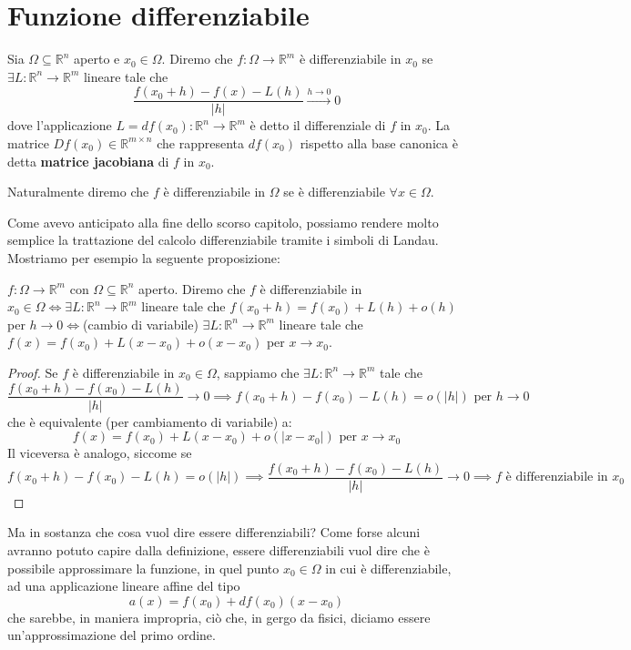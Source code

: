 \documentclass[openany]{book}
\begin{document}
\section{Funzione differenziabile}
\begin{definition}
Sia $\Omega \subseteq \mathbb{R}^n$ aperto e $x_0 \in \Omega$. Diremo che $f: \Omega \to \mathbb{R}^m$ è differenziabile in $x_0$ se $\exists L: \mathbb{R}^n \to \mathbb{R}^m$ lineare tale che
$$
\frac{f(x_0 + h)-f(x) - L(h)}{|h|} \stackrel{h \to 0}{\to} 0
$$
dove l'applicazione $L = df(x_0): \mathbb{R}^n \to \mathbb{R}^m$ è detto il differenziale di $f$ in $x_0$. La matrice $Df(x_0) \in \mathbb{R}^{m \times n}$ che rappresenta $df(x_0)$ rispetto alla base canonica è detta \textbf{matrice jacobiana} di $f$ in $x_0$.
\end{definition}
\begin{remark}
Naturalmente diremo che $f$ è differenziabile in $\Omega$ se è differenziabile $\forall x \in \Omega$.
\end{remark}
\noindent Come avevo anticipato alla fine dello scorso capitolo, possiamo rendere molto semplice la trattazione del calcolo differenziabile tramite i simboli di Landau. Mostriamo per esempio la seguente proposizione:
\begin{prop}
$f: \Omega \to \mathbb{R}^m$ con $\Omega \subseteq \mathbb{R}^n$ aperto. Diremo che $f$ è differenziabile in $x_0 \in \Omega \iff \exists L:\mathbb{R}^n \to \mathbb{R}^m$ lineare tale che $f(x_0 + h) = f(x_0) + L(h) + o(h)$ per $h \to 0 \iff $(cambio di variabile) $\exists L: \mathbb{R}^n \to \mathbb{R}^m$ lineare tale che $f(x) = f(x_0) + L(x-x_0) + o(x-x_0)$ per $x \to x_0$.
\end{prop}
\begin{proof}
Se $f$ è differenziabile in $x_0 \in \Omega$, sappiamo che $\exists L : \mathbb{R}^n \to \mathbb{R}^m$ tale che
$$
\frac{f(x_0 + h) - f(x_0) - L(h)}{|h|} \to 0 \implies f(x_0 + h) - f(x_0) - L(h) = o(|h|) \text{ per } h \to 0
$$
che è equivalente (per cambiamento di variabile) a:
$$
f(x) = f(x_0) + L(x-x_0) + o(|x-x_0|) \text{ per } x \to x_0
$$
Il viceversa è analogo, siccome se
$$
f(x_0 + h) - f(x_0) - L(h) = o(|h|) \implies \frac{f(x_0 + h) - f(x_0) - L(h)}{|h|} \to 0 \implies f \text{ è differenziabile in } x_0
$$
\end{proof}
\noindent Ma in sostanza che cosa vuol dire essere differenziabili? Come forse alcuni avranno potuto capire dalla definizione, essere differenziabili vuol dire che è possibile approssimare la funzione, in quel punto $x_0 \in \Omega$ in cui è differenziabile, ad una applicazione lineare affine del tipo $$a(x) = f(x_0) + df(x_0)(x-x_0)$$ che sarebbe, in maniera impropria, ciò che, in gergo da fisici, diciamo essere un'approssimazione del primo ordine. \\
\end{document}
